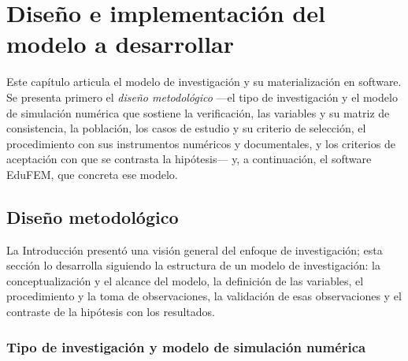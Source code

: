 \chapter{Diseño e implementación del modelo a desarrollar}
\label{cap:diseno}

Este capítulo articula el modelo de investigación y su materialización en software. Se presenta primero el \emph{diseño metodológico} —el tipo de investigación y el modelo de simulación numérica que sostiene la verificación, las variables y su matriz de consistencia, la población, los casos de estudio y su criterio de selección, el procedimiento con sus instrumentos numéricos y documentales, y los criterios de aceptación con que se contrasta la hipótesis— y, a continuación, el software EduFEM, que concreta ese modelo.

\section{Diseño metodológico}
\label{sec:metodologia}

La Introducción presentó una visión general del enfoque de investigación; esta sección lo desarrolla siguiendo la estructura de un modelo de investigación: la conceptualización y el alcance del modelo, la definición de las variables, el procedimiento y la toma de observaciones, la validación de esas observaciones y el contraste de la hipótesis con los resultados.

\subsection{Tipo de investigación y modelo de simulación numérica}
\label{sec:proceso-met}

